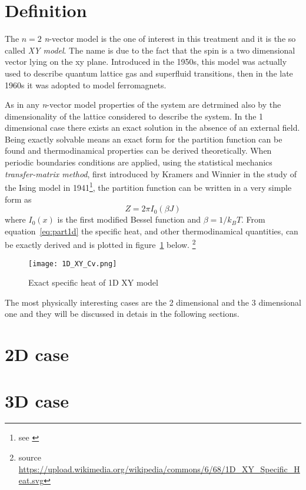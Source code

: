 \section{Definition}

The $n=2$ \textit{n}-vector model is the one of interest in this treatment and 
it is the so called \emph{XY model}. The name is due to the fact that the spin 
is a two dimensional vector lying on the xy plane. Introduced in the 1950s, 
this model was actually used to describe quantum lattice gas and superfluid 
transitions, then in the late 1960s it was adopted to model ferromagnets.

As in any \textit{n}-vector model properties of the system are detrmined also
by the dimensionality of the lattice considered to describe the system. In the 1 
dimensional case there exists an exact solution in the absence of an external
field. Being exactly solvable means an exact form for the partition function can
be found and thermodinamical properties can be derived theoretically. When 
periodic boundaries conditions are applied, using the statistical mechanics 
\emph{transfer-matrix method}, first introduced by Kramers and Winnier in the
study of the Ising model in 1941\footnote{see \cite{Kramers1941}}, the 
partition function can be written in a very simple form as 
\begin{equation}
\label{eq:part1d}
Z = 2\pi I_0(\beta J)
\end{equation}
where $I_0(x)$ is the first modified Bessel function and $\beta = 1/k_B T$.
From equation~\ref{eq:part1d} the specific heat, and other thermodinamical 
quantities, can be exactly derived and is plotted in figure~\ref{fig:1D_XY} below.
\footnote{source 
\url{https://upload.wikimedia.org/wikipedia/commons/6/68/1D_XY_Specific_Heat.svg}} 

\begin{figure}
\label{fig:1D_XY}
\centering
\texttt{[image: 1D\_XY\_Cv.png]}
\caption{Exact specific heat of 1D XY model}
\end{figure}

The most physically interesting cases are the 2 dimensional and the 3 dimensional
one and they will be discussed in detais in the following sections.


\section{2D case}




\section{3D case}


